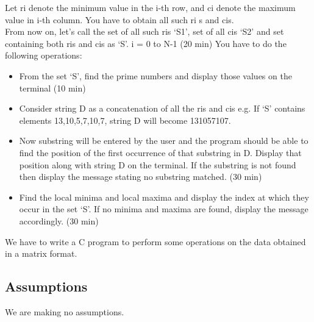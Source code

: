 \documentclass[12pt,a4paper]{article}
\begin{document}
        Let ri denote the minimum value in the i-th row, and ci denote the maximum value in i-th column. You have to obtain all such ri s and cis.\\From now on, let's call the set of all such ris ‘S1’, set of all cis ‘S2’ and set containing both ris and cis as ‘S’. i = 0 to N-1				 	 (20 min)
You have to do the following operations:
\begin{itemize}
\item From the set ‘S’, find the prime numbers and display those values on the terminal (10 min)
\item Consider string D as a concatenation of all the ris and cis e.g. If ‘S’ contains elements {13,10,5,7,10,7}, string D will become 131057107. \item Now substring will be entered by the user and the program should be able to find the position of the first occurrence of that substring in D. Display that position along with string D on the terminal. If the substring is not found then display the message stating no substring matched. 		(30 min)
\item Find the local minima and local maxima and display the index at which they occur in the set ‘S’. If no minima and maxima are found, display the message accordingly.		(30 min)
\end{itemize}

             \noindent We have to write a C program to perform some operations on the data obtained in a matrix format.
        \subsection{Assumptions}
            \noindent We are making no assumptions.
\end{document}
